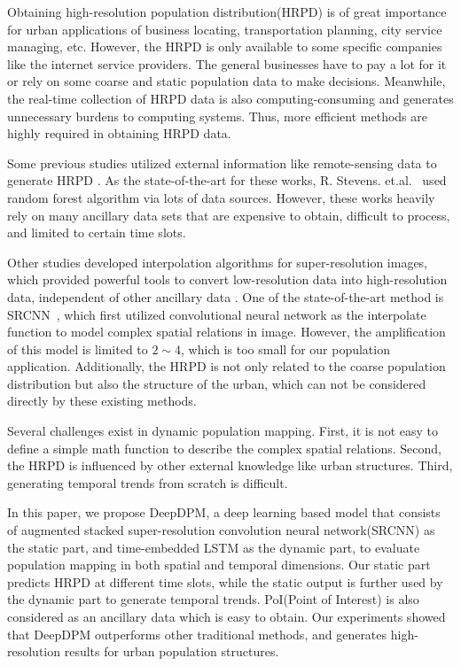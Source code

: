 \documentclass[letterpaper]{article} %
\begin{document}
Obtaining high-resolution population distribution(HRPD) is of great importance for urban applications of business locating, transportation planning, city service managing, etc. However, the HRPD is only available to some specific companies like the internet service providers. The general businesses have to pay a lot for it or rely on some coarse and static population data to make decisions. Meanwhile, the real-time collection of HRPD data is also computing-consuming and generates unnecessary burdens to computing systems. Thus, more efficient methods are highly required in obtaining HRPD data. 

 
 Some previous studies utilized external information like remote-sensing data to generate HRPD \cite{Wu2005Population,Gaughan2013HighRP,stevens2015disaggregating}. As the state-of-the-art for these works, R. Stevens. et.al.~\cite{stevens2015disaggregating} used random forest algorithm via lots of data sources. However, these works heavily rely on many ancillary data sets that are expensive to obtain, difficult to process, and limited to certain time slots. 

Other studies developed interpolation algorithms for super-resolution images, which provided powerful tools to convert low-resolution data into high-resolution data, independent of other ancillary data \cite{Nasrollahi2014Survey,Yang2014SingleImageSA,Vandal2017DeepSD}. One of the state-of-the-art method is SRCNN~\cite{Dong2016ImageSU}, which first utilized convolutional neural network as the interpolate function to model complex spatial relations in image. However, the amplification of this model is limited to $2\sim4$, which is too small for our population application. Additionally, the HRPD is not only related to the coarse population distribution but also the structure of the urban, which can not be considered directly by these existing methods.

Several challenges exist in dynamic population mapping. First, it is not easy to define a simple math function to describe the complex spatial relations. Second, the HRPD is influenced by other external knowledge like urban structures. Third, generating temporal trends from scratch is difficult.

In this paper, we propose DeepDPM, a deep learning based model that consists of augmented stacked super-resolution convolution neural network(SRCNN) as the static part, and time-embedded LSTM as the dynamic part, to evaluate population mapping in both spatial and temporal dimensions. Our static part predicts HRPD at different time slots, while the static output is further used by the dynamic part to generate temporal trends. PoI(Point of Interest) is also considered as an ancillary data which is easy to obtain. Our experiments showed that DeepDPM outperforms other traditional methods, and generates high-resolution results for urban population structures.
\end{document}
